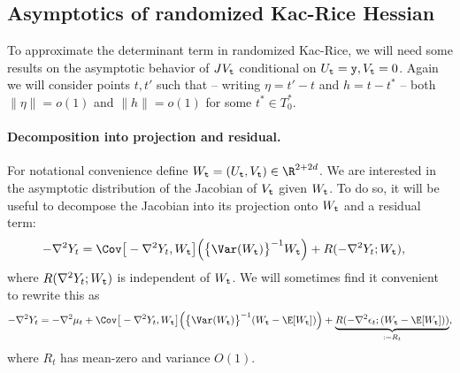 \documentclass{article}
\begin{document}
	\subsection{Asymptotics of randomized Kac-Rice Hessian}
	\label{subsec:randomized-hessian-asymptotics}
	
	To approximate the determinant term in randomized Kac-Rice, we will need some results on the asymptotic behavior of $JV_{{\tt t}}$ conditional on $U_{{\tt t}} = {\tt y}, V_{{\tt t}} = 0$. Again we will consider points $t,  t'$ such that -- writing $\eta = t' - t$ and $h = t - t^*$ -- both $\|\eta\| = o(1)$ and $\|h\| = o(1)$ for some $t^* \in T_0^*$. 
	
	\paragraph{Decomposition into projection and residual.}
	For notational convenience define $W_{{\tt t}} = (U_{{\tt t}}, V_{{\tt t}}) \in \R^{2 + 2d}$. We are interested in the asymptotic distribution of the Jacobian of $V_{\tt t}$ given $W_{{\tt t}}$. To do so, it will be useful to decompose the Jacobian into its projection onto $W_{{\tt t}}$ and a residual term:
	\begin{equation}
		\begin{aligned}
			-\nabla^2 Y_t 
			& = 
			\Cov\big[-\nabla^2 Y_t, W_{{\tt t}}\big]\Big(\big\{\Var(W_{{\tt t}})\big\}^{-1} W_{{\tt t}}\Big) + R(-\nabla^2 Y_t; W_{{\tt t}}),
		\end{aligned}
	\end{equation}
	where $R(\nabla^2 Y_t; W_{{\tt t}})$ is independent of $W_{{\tt t}}$. We will sometimes find it convenient to rewrite this as
	\begin{equation}
		\label{eqn:hessian-decomposition}
		-\nabla^2 Y_t = -\nabla^2 \mu_t +	\Cov\big[-\nabla^2 Y_t, W_{{\tt t}}\big]\Big(\big\{\Var(W_{{\tt t}})\big\}^{-1} (W_{{\tt t}} - \E[W_{{\tt t}}])\Big) + \underbrace{R(-\nabla^2 \epsilon_t; (W_{{\tt t}} - \E[W_{{\tt t}}]))}_{:= R_t},
	\end{equation}
	where $R_t$ has mean-zero and variance $O(1)$.
	
\end{document}
